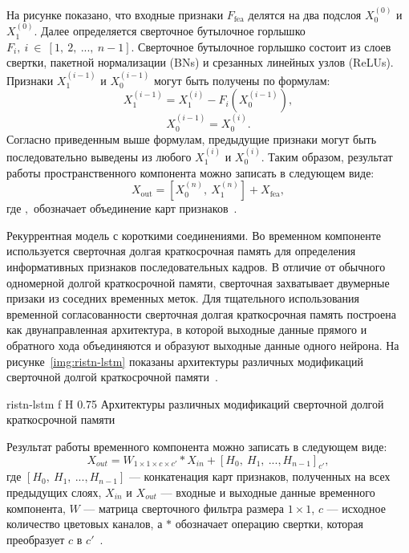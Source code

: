 \documentclass{bmstu}
\begin{document}
На рисунке показано, что входные признаки $F_{\text{fea}}$ делятся на два подслоя $X^{(0)}_{0}$ и $X^{(0)}_{1}$. 
Далее определяется сверточное бутылочное горлышко $F_i,~i~\in~[1,~2,~...,~n - 1]$. 
Сверточное бутылочное горлышко состоит из слоев свертки, пакетной нормализации (BNs) и срезанных линейных узлов (ReLUs). 
Признаки $X^{(i - 1)}_{1}$ и $X^{(i - 1)}_{0}$ могут быть получены по формулам:
\begin{equation}
X^{(i - 1)}_{1} = X^{(i)}_{1} - F_{i}(X^{(i - 1)}_{0}),
\end{equation}
\begin{equation}
X^{(i - 1)}_{0} = X^{(i)}_{0}.
\end{equation}
Согласно приведенным выше формулам, предыдущие признаки могут быть последовательно выведены из любого $X^{(i)}_{1}$ и $X^{(i)}_{0}$. 
Таким образом, результат работы пространственного компонента можно записать в следующем виде:
\begin{equation}
X_{\text{out}} = [X^{(n)}_{0},~X^{(n)}_{1}] + X_{\text{fea}},
\end{equation}
где $,$ обозначает объединение карт признаков~\cite{Xiaobin2019}.

Рекуррентная модель с короткими соединениями. 
Во временном компоненте используется сверточная долгая краткосрочная память для определения информативных признаков последовательных кадров. 
В отличие от обычного одномерной долгой краткосрочной памяти, сверточная захватывает двумерные призаки из соседних временных меток. 
Для тщательного использования временной согласованности сверточная долгая краткосрочная память построена как двунаправленная архитектура, в которой выходные данные прямого и обратного хода объединяются и образуют выходные данные одного нейрона. 
На рисунке~\ref{img:ristn-lstm} показаны архитектуры различных модификаций сверточной долгой краткосрочной памяти~\cite{Xiaobin2019}.

    {ristn-lstm}
    {f}
    {H}
    {0.75\textwidth}
    {Архитектуры различных модификаций сверточной долгой краткосрочной памяти~\cite{Xiaobin2019}}
    
Результат работы временного компонента можно записать в следующем виде:
\begin{equation}
X_{out} = W_{1 \times 1 \times c \times c'} * X_{in} + [H_0,~H_1,~...,H_{n - 1}]_{c'},
\end{equation}
где $[H_0,~H_1,~...,H_{n - 1}]$ --- конкатенация карт признаков, полученных на всех предыдущих слоях, $X_{in}$ и $X_{out}$ --- входные и выходные данные временного компонента, $W$ --- матрица сверточного фильтра размера $1 \times 1$, $c$ --- исходное количество цветовых каналов, а $*$ обозначает операцию свертки, которая преобразует $c$ в $c'$~\cite{Xiaobin2019}.
\end{document}
